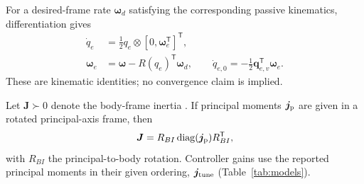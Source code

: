 \documentclass[letterpaper, 10 pt, conference]{ieeeconf}
\newcommand{\T}{^{\mathsf T}}
\begin{document}
For a desired-frame rate $\bm\omega_d$ satisfying the corresponding passive kinematics, differentiation gives
\begin{align}
 \dot q_e&=\tfrac12q_e\otimes[0,\bm\omega_e\T]\T,\\
 \bm\omega_e&=\bm\omega-R(q_e)\T\bm\omega_d,\qquad
 \dot q_{e,0}=-\tfrac12\bm q_{e,v}\T\bm\omega_e.
 \label{eq:errkin}
\end{align}
These are kinematic identities; no convergence claim is implied.

Let $\bm J\succ0$ denote the body-frame inertia \cite{schaub2018amss}. If principal moments $\bm j_{\rm p}$ are given in a rotated principal-axis frame, then
\begin{equation}
 \bm J=R_{BI}\operatorname{diag}(\bm j_{\rm p})R_{BI}\T,
 \label{eq:inertiaframe}
\end{equation}
with $R_{BI}$ the principal-to-body rotation. Controller gains use the reported principal moments in their given ordering, $\bm j_{\rm tune}$ (Table~\ref{tab:models}).
\end{document}
